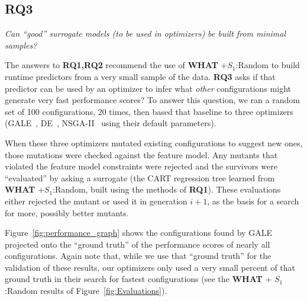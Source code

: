 \documentclass{sig-alternative}
\newcommand{\fig}[1]{Figure~\ref{fig:#1}}
\newcommand{\what}{{\bf WHAT }}
\begin{document}
\subsection{RQ3}

 {\em
Can ``good'' surrogate models (to be used in optimizers)
be built from minimal samples?}

The answers to {\bf RQ1,RQ2} recommend the use of \what+$S_1$:Random to build runtime predictors from a very small sample
of the data. {\bf RQ3}
asks if that predictor can be used by an optimizer to infer what {\em other} configurations might generate very fast performance scores?
To answer this question,  we ran  a random set of 100 
configurations, 20 times, then based that baseline to three optimizers (GALE~\cite{krall2014gale}, DE~\cite{storn1997differential}, NSGA-II~\cite{deb00afast} using their
default parameters).
 
When these three optimizers mutated existing configurations to suggest new ones,
those mutations were checked against the feature model. Any mutants that violated the feature model constraints were rejected
and the survivors were ``evaluated'' by asking a surrogate
(the  CART regression tree learned from \what+$S_1$:Random, built using the methods of {\bf RQ1}).
These evaluations either rejected the mutant or used it in generation $i+1$, as the basis for a search for more, possibly
better  mutants.

\fig{performance_graph} shows the configurations found by GALE projected onto the ``ground truth'' of the performance scores of nearly
all configurations. Again note that, while we use that ``ground truth'' for the validation of these results, our optimizers only
used a very small percent of that ground truth in their search for fastest configurations (see the \what + $S_1$:Random
results of \fig{Evaluations}).
\end{document}
